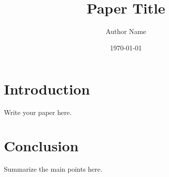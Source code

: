 \documentclass[a4paper,11pt]{jsarticle}
\title{Paper Title}
\author{Author Name}
\date{\today}
\begin{document}
\maketitle

\section{Introduction}

Write your paper here.

\section{Conclusion}

Summarize the main points here.
\end{document}
